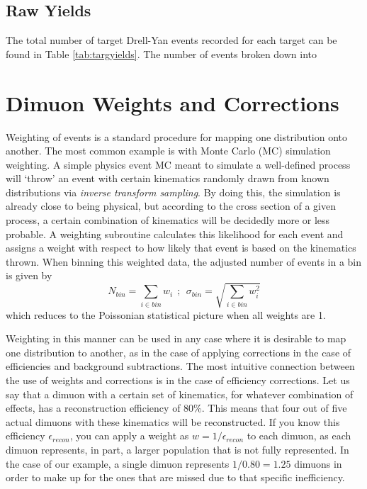 \subsection{Raw Yields}

The total number of target Drell-Yan events recorded for each target can be found in Table
\ref{tab:targyields}. The number of events broken down into 

\section{Dimuon Weights and Corrections}

Weighting of events is a standard procedure for mapping one distribution onto another. The most common example is with Monte Carlo (MC) simulation weighting. A simple physics event MC meant to simulate a well-defined process will `throw' an event with certain kinematics randomly drawn from known distributions via \emph{inverse transform sampling}. By doing this, the simulation is already close to being physical, but according to the cross section of a given process, a certain combination of kinematics will be decidedly more or less probable. A weighting subroutine calculates this likelihood for each event and assigns a weight with respect to how likely that event is based on the kinematics thrown. When binning this weighted data, the adjusted number of events in a bin is given by
\begin{equation}
	N_{bin} = \sum_{i \in bin} w_i\ \ ;\ \ \sigma_{bin} = \sqrt{\sum_{i\in bin} w_i^2}
	\label{eq:gmc-weight}
\end{equation}
which reduces to the Poissonian statistical picture when all weights are 1.

Weighting in this manner can be used in any case where it is desirable to map one distribution to another, as in the case of applying corrections in the case of efficiencies and background subtractions. The most intuitive connection between the use of weights and corrections is in the case of efficiency corrections. Let us say that a dimuon with a certain set of kinematics, for whatever combination of effects, has a reconstruction efficiency of 80\%. This means that four out of five actual dimuons with these kinematics will be reconstructed. If you know this efficiency $\epsilon_{recon}$, you can apply a weight as $w = 1/\epsilon_{recon}$ to each dimuon, as each dimuon represents, in part, a larger population that is not fully represented. In the case of our example, a single dimuon represents $1/0.80 = 1.25$ dimuons in order to make up for the ones that are missed due to that specific inefficiency.

